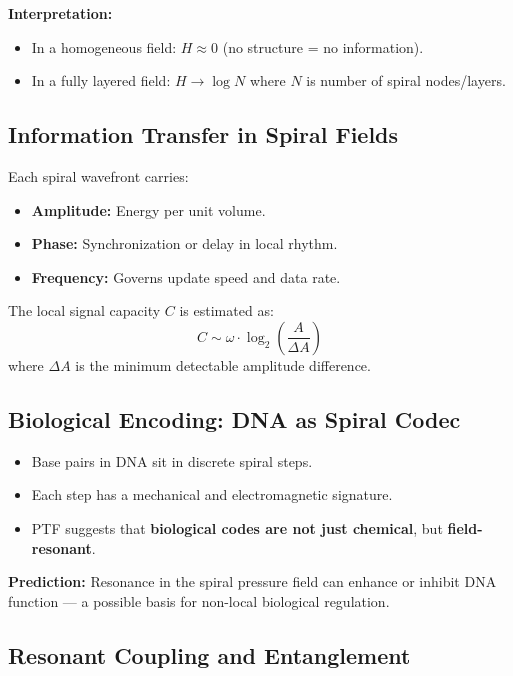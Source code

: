 \documentclass[a4paper,12pt]{article}
\begin{document}
\textbf{Interpretation:}
\begin{itemize}
    \item In a homogeneous field: \( H \approx 0 \) (no structure = no information).
    \item In a fully layered field: \( H \to \log N \) where \(N\) is number of spiral nodes/layers.
\end{itemize}

\subsection{Information Transfer in Spiral Fields}

Each spiral wavefront carries:
\begin{itemize}
    \item \textbf{Amplitude:} Energy per unit volume.
    \item \textbf{Phase:} Synchronization or delay in local rhythm.
    \item \textbf{Frequency:} Governs update speed and data rate.
\end{itemize}

The local signal capacity \( C \) is estimated as:
\[
C \sim \omega \cdot \log_2\left( \frac{A}{\Delta A} \right)
\]
where \( \Delta A \) is the minimum detectable amplitude difference.

\subsection{Biological Encoding: DNA as Spiral Codec}

\begin{itemize}
    \item Base pairs in DNA sit in discrete spiral steps.
    \item Each step has a mechanical and electromagnetic signature.
    \item PTF suggests that \textbf{biological codes are not just chemical}, but \textbf{field-resonant}.
\end{itemize}

\textbf{Prediction:}  
Resonance in the spiral pressure field can enhance or inhibit DNA function — a possible basis for non-local biological regulation.

\subsection{Resonant Coupling and Entanglement}
\end{document}
